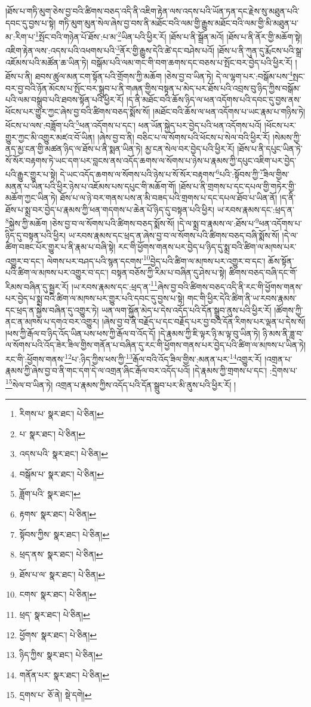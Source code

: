 །ཐོས་པ་གཏི་མུག་ཅེས་བྱ་བའི་ཚིགས་བཅད་འདི་ནི་འཇིག་རྟེན་ལས་འདས་པའི་ཡོན་ཏན་དང་རྗེས་སུ་མཐུན་པའི་དབང་དུ་བྱས་པ་སྟེ། གཏི་མུག་མུན་སེལ་ཞེས་བྱ་བས་ནི་མཐོང་བའི་ལམ་གྱི་རྒྱུས་མཐོང་བའི་ལམ་གྱི་མི་མཐུན་པ་མ་:རིག་པ་\footnote{རིགས་པ་  སྣར་ཐང་།  པེ་ཅིན། }སྤོང་བའི་གཉེན་པོ་ཐོས་:པ་མ་\footnote{པ་  སྣར་ཐང་།  པེ་ཅིན། }ཡིན་པའི་ཕྱིར་རོ། །ཐོས་པ་ནི་སྒྲོན་མའོ། །ཐོས་པ་ནི་ནོར་གྱི་མཆོག་སྟེ། འཇིག་རྟེན་ལས་:འདས་པའི་འཕགས་པའི་\footnote{འདས་པའི་  སྣར་ཐང་།  པེ་ཅིན། }ནོར་གྱི་རྒྱུས་དེའི་ཚེ་དང་བཤེས་པའོ། །ཐོས་པ་ནི་ཀུན་དུ་རྨོངས་པའི་སྒྲ་འཇོམས་པའི་མཚོན་ཆ་ཡིན་ཏེ། བསྒོམ་པའི་ལམ་གང་གི་བག་ཆགས་དང་བཅས་པ་སྤོང་བར་བྱེད་པའི་ཕྱིར་རོ། །ཐོས་པ་ནི། ཐབས་ཚུལ་མན་ངག་སྟོན་པའི་གྲོགས་ཀྱི་མཆོག །ཅེས་བྱ་བ་ཡིན་ཏེ། དེ་ལ་ལྷག་པར་:བསྒོམ་པས་\footnote{བསྒོམ་པ་  སྣར་ཐང་།  པེ་ཅིན། }སྤང་བར་བྱ་བའི་ཉོན་མོངས་པ་སྤོང་བར་སྒྲུབ་པ་ནི་གཞན་གྱིས་བསྟན་པ་མེད་པར་ཐོས་པའི་འབྲས་བུ་ཉིད་ཀྱིས་བསྒོམ་པའི་ལམ་བསྒྲུབ་པའི་ཐབས་སྟོན་པའི་ཕྱིར་རོ། །ད་ནི་མཐོང་བའི་ཆོས་ཉིད་ལ་ཕན་འདོགས་པའི་དབང་དུ་བྱས་ནས་ཕོངས་པར་གྱུར་ཀྱང་ཞེས་བྱ་བའི་ཚིགས་བཅད་སྨོས་སོ། །མཐོང་བའི་ཆོས་ལ་ཕན་འདོགས་པ་ཡང་རྣམ་པ་གཉིས་ཏེ། ཕོངས་པ་ལས་:བཟློག་པའི་\footnote{ཟློག་པའི་  སྣར་ཐང་། }ཕན་འདོགས་པ་དང་། ཕན་ཡོན་སྐྱེད་པར་བྱེད་པའི་ཕན་འདོགས་པའོ། །ཕོངས་པར་གྱུར་ཀྱང་མི་འགྱུར་མཛའ་བོ་ཡིན། །ཞེས་བྱ་བ་ནི། བཅིང་པ་ལ་སོགས་པའི་ཕོངས་པ་སེལ་བའི་ཕྱིར་རོ། །སེམས་ཀྱི་ནད་མྱ་ངན་གྱི་མཚན་ཉིད་ལ་ཐོས་པ་ནི་སྨན་ཡིན་ཏེ། མྱ་ངན་སེལ་བར་བྱེད་པའི་ཕྱིར་རོ། །ཐོས་པ་ནི་དཔུང་ཡིན་ཏེ་སོ་སོར་བརྟགས་ཏེ་ཡང་དག་པར་བླངས་ནས་འདོད་ཆགས་ལ་སོགས་པ་ཉེས་པ་རྣམས་ཀྱི་དཔུང་འཇིག་པར་བྱེད་པའི་རྒྱུར་གྱུར་པ་སྟེ། དེ་ཡང་འདོད་ཆགས་ལ་སོགས་པའི་ཉེས་པ་སོ་སོར་བརྟགས་\footnote{རྟགས་  སྣར་ཐང་།  པེ་ཅིན། }པའི་:སྟོབས་ཀྱི་\footnote{སྟོབས་ཀྱིས་  སྣར་ཐང་།  པེ་ཅིན། }ཟིལ་གྱིས་མནན་པ་ཡིན་པའི་ཕྱིར་ཉེས་པ་འཇོམས་པས་དཔུང་གི་མཆོག་གོ། །ཐོས་པ་ནི་གྲགས་པ་དང་དཔལ་གྱི་གཏེར་གྱི་མཆོག་ཀྱང་ཡིན་ཏེ། ཐོས་པ་ལ་ཉེ་བར་གནས་པས་ན་མི་བཟད་པའི་གྲགས་པ་དང་དཔལ་ཐོབ་པ་ཡིན་ནོ། །ད་ནི་ཐོས་པ་སྨྲ་བར་བྱེད་པ་རྣམས་ཀྱི་ཕན་གདགས་པ་ཆེན་པོ་ཉིད་དུ་བསྟན་པའི་ཕྱིར། ཡ་རབས་རྣམས་དང་:ཕྲད་ན་\footnote{ཕྲད་ནས་  སྣར་ཐང་།  པེ་ཅིན། }སྐྱེས་ཀྱི་མཆོག །ཅེས་བྱ་བ་ལ་སོགས་པའི་ཚིགས་བཅད་སྨོས་སོ། །དེ་ལ་སྨྲ་བ་རྣམས་ལ་:ཐོས་པ་\footnote{ཐོས་པ་ལ་  སྣར་ཐང་།  པེ་ཅིན། }ཕན་འདོགས་པ་ཉིད་དུ་བསྟན་པའི་ཕྱིར། ཡ་རབས་རྣམས་དང་ཕྲད་ན་ཞེས་བྱ་བ་ལ་སོགས་པའི་ཚིགས་བཅད་བཞི་སྨོས་སོ། །དེ་ལ་ཚིག་བཟང་པོར་གྱུར་པ་ནི་རྣམ་པ་བཞི་སྟེ། རང་གི་ཕྱོགས་གནས་པར་བྱེད་པ་ཉིད་དུ་སྨྲ་བའི་ཚིག་ལ་མཁས་པར་འགྱུར་བ་དང་། ལེགས་པར་བཤད་པའི་སྙན་དངགས་\footnote{ངགས་  སྣར་ཐང་།  པེ་ཅིན། }བྱེད་པའི་ཚིག་ལ་མཁས་པར་འགྱུར་བ་དང་། ཆོས་སྟོན་པའི་ཚིག་ལ་མཁས་པར་འགྱུར་བ་དང་། བསྟན་བཅོས་ཀྱི་རིམ་པ་བཞིན་དུ་ཤེས་པ་སྟེ། ཚིགས་བཅད་བཞི་དང་གོ་རིམས་བཞིན་དུ་སྦྱར་རོ། །ཡ་རབས་རྣམས་དང་:ཕྲད་ན་\footnote{ཕྲད་  སྣར་ཐང་།  པེ་ཅིན། }ཞེས་བྱ་བའི་ཚིགས་བཅད་འདི་ནི་རང་གི་ཕྱོགས་གནས་པར་བྱེད་པ་སྨྲ་བའི་ཚིག་ལ་མཁས་པར་གྱུར་པའི་དབང་དུ་བྱས་པ་སྟེ། གང་གི་ཕྱིར་དེའི་ཚིག་ནི་ཡ་རབས་རྣམས་དང་ཕྲད་ན་སྐྱེས་བཞིན་དུ་འགྱུར་ཏེ། ཡན་ལག་སྐྱོན་མེད་པ་དེས་འདོད་པའི་དོན་སྒྲུབ་ནུས་པའི་ཕྱིར་རོ། །ཚོགས་ཀྱི་ནང་ན་མཁས་པ་དགའ་བར་འགྱུར། །ཞེས་བྱ་བ་ནི་བརྗོད་པ་དང་བརྗོད་པར་བྱ་བའི་དོན་རིགས་པར་ལྡན་པ་དེས་སོ། །ཕས་ཀྱི་རྒོལ་བ་ཉིད་འོད་ཡིན་པས་ཕས་ཀྱི་རྒོལ་བ་འོད་དོ། །དེ་རྣམས་ཀྱི་ཇི་ལྟར་ཉི་མ་ལྟ་བུ་ཡིན་ཏེ། ཉི་མས་ནི་ཟླ་བ་ལ་སོགས་པའི་འོད་ཟེར་ཟིལ་གྱིས་གནོན་པ་བཞིན་དུ་རང་གི་ཕྱོགས་གནས་པར་བྱེད་པའི་ཚིག་ལ་མཁས་པ་ཡིན་ཏེ། རང་གི་:ཕྱོགས་གནས་\footnote{ཕྱོགས་  སྣར་ཐང་།  པེ་ཅིན། }པ་:ཉིད་ཀྱིས་ཕས་ཀྱི་\footnote{ཉིད་ཀྱིས་  སྣར་ཐང་།  པེ་ཅིན། }རྒོལ་བའི་འོད་ཟིལ་གྱིས་:མནན་པར་\footnote{གནོན་པར་  སྣར་ཐང་།  པེ་ཅིན། }འགྱུར་རོ། །འགྲན་པ་རྣམས་ཀྱི་ཞེས་བྱ་བ་ནི་གང་དག་དེ་ལ་འགྲན་ཞིང་རྒོལ་བར་འདོད་པའོ། །དེ་རྣམས་ཀྱི་གྲགས་པ་དང་། :དྲེགས་པ་\footnote{དྲགས་པ་  ཅོ་ནེ།  སྡེ་དགེ། }སེལ་བ་ཡིན་ཏེ། འགྲན་པ་རྣམས་ཀྱིས་འདོད་པའི་དོན་སྒྲུབ་པར་མི་ནུས་པའི་ཕྱིར་རོ། །
